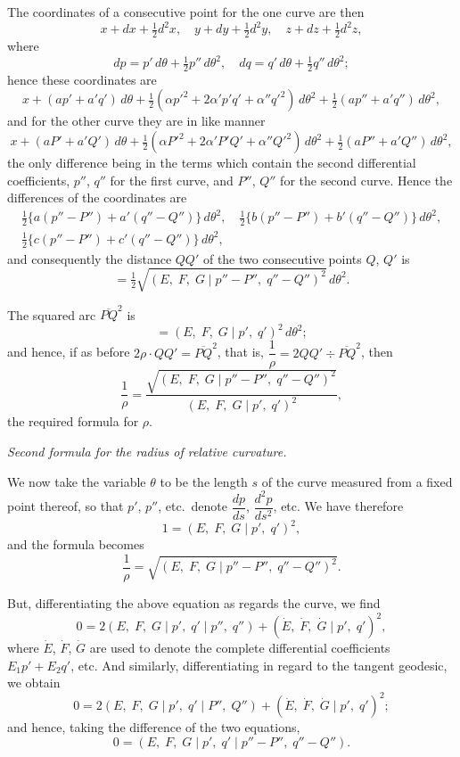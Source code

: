 \documentclass[11pt,a4paper,english]{article}
\theoremstyle{plain}
\begin{document}
The coordinates of a consecutive point for the one curve are then
\[
x + dx + \tfrac{1}{2}d^2x,\quad y + dy + \tfrac{1}{2}d^2y,\quad z + dz + \tfrac{1}{2}d^2z,
\]
where
\[
dp = p'\,d\theta + \tfrac{1}{2}p''\,d\theta^2,\quad dq = q'\,d\theta + \tfrac{1}{2}q''\,d\theta^2;
\]
hence these coordinates are
\[
x + (ap' + a'q')\,d\theta + \tfrac{1}{2}(\alpha p'^2 + 2\alpha'p'q' + \alpha''q'^2)\,d\theta^2 + \tfrac{1}{2}(ap'' + a'q'')\,d\theta^2,
\]
and for the other curve they are in like manner
\[
x + (aP' + a'Q')\,d\theta + \tfrac{1}{2}(\alpha P'^2 + 2\alpha'P'Q' + \alpha''Q'^2)\,d\theta^2 + \tfrac{1}{2}(aP'' + a'Q'')\,d\theta^2,
\]
the only difference being in the terms which contain the second differential coefficients, $p''$, $q''$ for the first curve, and $P''$, $Q''$ for the second curve. Hence the differences of the coordinates are
\begin{gather*}
\tfrac{1}{2}\{a(p'' - P'') + a'(q'' - Q'')\}\,d\theta^2,\quad
\tfrac{1}{2}\{b(p'' - P'') + b'(q'' - Q'')\}\,d\theta^2, \\
\tfrac{1}{2}\{c(p'' - P'') + c'(q'' - Q'')\}\,d\theta^2,
\end{gather*}
and consequently the distance $QQ'$ of the two consecutive points $Q$, $Q'$ is
\[
= \tfrac{1}{2}\sqrt{(E,\; F,\; G \mid p'' - P'',\; q'' - Q'')^2}\,d\theta^2.
\]

The squared arc $\overline{PQ}^2$ is
\[
= (E,\; F,\; G \mid p',\; q')^2\,d\theta^2;
\]
and hence, if as before $2\rho \cdotp QQ' = \overline{PQ}^2$, that is, $\dfrac{1}{\rho} = 2QQ' \div \overline{PQ}^2$, then
\[
\frac{1}{\rho} = \frac{\sqrt{(E,\; F,\; G \mid p'' - P'',\; q'' - Q'')^2}}{(E,\; F,\; G \mid p',\; q')^2},
\]
the required formula for $\rho$.

\begin{center}
\textit{Second formula for the radius of relative curvature.}
\end{center}

We now take the variable $\theta$ to be the length $s$ of the curve measured from a fixed point thereof, so that $p'$, $p''$, etc.\ denote $\dfrac{dp}{ds}$, $\dfrac{d^2p}{ds^2}$, etc. We have therefore
\[
1 = (E,\; F,\; G \mid p',\; q')^2,
\]
and the formula becomes
\[
\frac{1}{\rho} = \sqrt{(E,\; F,\; G \mid p'' - P'',\; q'' - Q'')^2}.
\]

But, differentiating the above equation as regards the curve, we find
\[
0 = 2(E,\; F,\; G \mid p',\; q' \mid p'',\; q'') + (\dot{E},\; \dot{F},\; \dot{G} \mid p',\; q')^2,
\]
where $\dot{E}$, $\dot{F}$, $\dot{G}$ are used to denote the complete differential coefficients $E_1 p' + E_2 q'$, etc. And similarly, differentiating in regard to the tangent geodesic, we obtain
\[
0 = 2(E,\; F,\; G \mid p',\; q' \mid P'',\; Q'') + (\dot{E},\; \dot{F},\; \dot{G} \mid p',\; q')^2;
\]
and hence, taking the difference of the two equations,
\[
0 = (E,\; F,\; G \mid p',\; q' \mid p'' - P'',\; q'' - Q'').
\]
\end{document}
